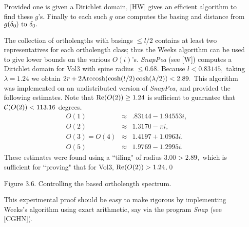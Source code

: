 Provided one is given a Dirichlet domain, [HW] gives an efficient algorithm to find these $g$'s.   Finally to each such $g$ one
computes the basing and distance from $g(\delta_0)\  {\rm to}\  \delta_0.$

The collection of ortholengths with basings $\le l/2$ contains at least two
representatives for each ortholength class;  thus the Weeks algorithm can
be used
to give lower bounds on the various $O(i)$'s.  {\it SnapPea} (see [W]) computes a Dirichlet domain
for Vol3 with spine radius $\le 0.68.$  
Because $l < 0.83145,$ taking $\lambda=1.24$ we
obtain $2r+2{\rm Arccosh}(\cosh(l/2)\cosh(\lambda/2)) < 2.89.$  This algorithm was
implemented on an undistributed version of {\it SnapPea}, and provided the following estimates.  
Note that ${\rm Re}(O(2)) \ge 1.24$ is sufficient to guarantee that ${\cal C}(O(2)) < 113.16$ degrees.
\begin{eqnarray*}
O(1)&\approx& .83144 - 1.94553 i,\\
O(2)&\approx& 1.3170 - \pi i, \\
O(3)=O(4) &\approx& 1.4197 + 1.0963 i,\\
O(5) &\approx& 1.9769 -1.2995 i. \end{eqnarray*}
These
estimates were found using a ``tiling" of radius $3.00 > 2.89,$ which is
sufficient for ``proving" that for Vol3, ${\rm Re}(O(2)) > 1.24$.\hfill\qed

\centerline{Figure 3.6. Controlling the based ortholength spectrum.}


 This experimental  proof should be easy to make rigorous by
implementing Weeks's algorithm using exact arithmetic, say via 
the program {\it Snap} (see [CGHN]).
\enddemo

